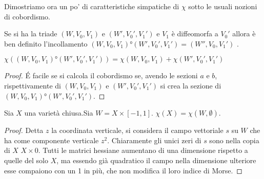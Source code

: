 Dimostriamo ora un po' di caratteristiche simpatiche di $\chi$ sotto le usuali nozioni di cobordismo.

\begin{defn}
Se si ha la triade $(W, V_0, V_1)$ e $(W', V_0', V_1')$ e $V_1$ è diffeomorfa a $V_0'$ allora è ben definito l'incollamento $(W, V_0, V_1)°(W', V_0', V_1')=(W'', V_0, V_1')$ .
\end{defn}
\begin{teo}
$\chi((W, V_0, V_1)°(W', V_0', V_1'))=\chi(W, V_0, V_1)+\chi(W', V_0', V_1')$
\end{teo}
\begin{proof}
\'E facile se si calcola il cobordismo se, avendo le sezioni $a$ e $b$, rispettivamente di $(W, V_0, V_1)$ e $(W', V_0', V_1')$ si crea la sezione di $(W, V_0, V_1)°(W', V_0', V_1')$.
\end{proof}

\begin{teo}
Sia $X$ una varietà chiusa.Sia $W=X\times [-1,1]$. $\chi(X)=\chi(W, \emptyset)$.   
\end{teo}
\begin{proof}
Detta $z$ la coordinata verticale, si considera il campo vettoriale $s$ su $W$ che ha come componente verticale $z^2$. Chiaramente gli unici zeri di $s$ sono nella copia di $X$ $X\times{0}$. Tutti le matrici hessiane aumentano di una dimensione rispetto a quelle del solo $X$, ma essendo già quadratico il campo nella dimensione ulteriore esse compaiono con un 1 in più, che non modifica il loro indice di Morse.
\end{proof}

